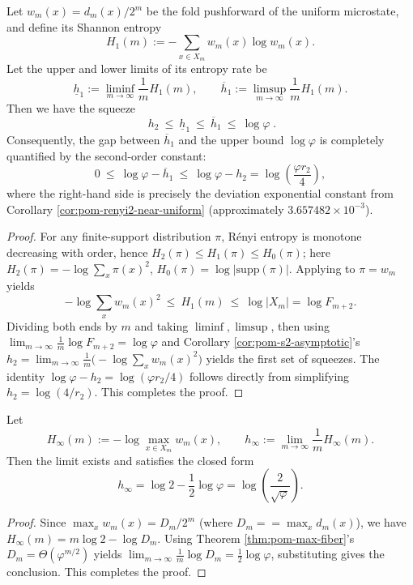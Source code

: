 \begin{corollary}[Entropy Spectrum Squeeze: \texorpdfstring{$h_2\le h_1\le \log\varphi$}{h2<=h1<=log phi}]\label{cor:pom-shannon-entropy-squeeze}
Let \(w_m(x)=d_m(x)/2^m\) be the fold pushforward of the uniform microstate, and define its Shannon entropy
\[
H_1(m):=-\sum_{x\in X_m}w_m(x)\log w_m(x).
\]
Let the upper and lower limits of its entropy rate be
\[
\underline h_1:=\liminf_{m\to\infty}\frac{1}{m}H_1(m),
\qquad
\overline h_1:=\limsup_{m\to\infty}\frac{1}{m}H_1(m).
\]
Then we have the squeeze
\[
\boxed{\;
h_2\ \le\ \underline h_1\ \le\ \overline h_1\ \le\ \log\varphi\; }.
\]
Consequently, the gap between \(\overline h_1\) and the upper bound \(\log\varphi\) is completely quantified by the second-order constant:
\[
0\ \le\ \log\varphi-\overline h_1\ \le\ \log\varphi-h_2
=\log\!\left(\frac{\varphi r_2}{4}\right),
\]
where the right-hand side is precisely the deviation exponential constant from Corollary \ref{cor:pom-renyi2-near-uniform} (approximately \(3.657482\times 10^{-3}\)).
\end{corollary}
\begin{proof}
For any finite-support distribution \(\pi\), Rényi entropy is monotone decreasing with order, hence \(H_2(\pi)\le H_1(\pi)\le H_0(\pi)\);
here \(H_2(\pi)=-\log\sum_x\pi(x)^2\), \(H_0(\pi)=\log|\mathrm{supp}(\pi)|\).
Applying to \(\pi=w_m\) yields
\[
-\log\sum_x w_m(x)^2\ \le\ H_1(m)\ \le\ \log|X_m|=\log F_{m+2}.
\]
Dividing both ends by \(m\) and taking \(\liminf,\limsup\), then using \(\lim_{m\to\infty}\frac{1}{m}\log F_{m+2}=\log\varphi\) and Corollary \ref{cor:pom-s2-asymptotic}'s
\(
h_2=\lim_{m\to\infty}\frac{1}{m}\bigl(-\log\sum_x w_m(x)^2\bigr)
\)
yields the first set of squeezes. The identity \(\log\varphi-h_2=\log(\varphi r_2/4)\) follows directly from simplifying \(h_2=\log(4/r_2)\). This completes the proof.
\end{proof}

\begin{corollary}\label{cor:pom-min-entropy-rate}
Let
\[
H_\infty(m):=-\log\max_{x\in X_m}w_m(x),
\qquad
h_\infty:=\lim_{m\to\infty}\frac{1}{m}H_\infty(m).
\]
Then the limit exists and satisfies the closed form
\[
\boxed{\;
h_\infty=\log 2-\frac{1}{2}\log\varphi=\log\!\left(\frac{2}{\sqrt{\varphi}}\right).\;}
\]
\end{corollary}
\begin{proof}
Since \(\max_x w_m(x)=D_m/2^m\) (where \(D_m==\max_x d_m(x)\)), we have
\(
H_\infty(m)=m\log 2-\log D_m
\).
Using Theorem \ref{thm:pom-max-fiber}'s \(D_m=\Theta(\varphi^{m/2})\) yields
\(
\lim_{m\to\infty}\frac{1}{m}\log D_m=\frac{1}{2}\log\varphi
\),
substituting gives the conclusion. This completes the proof.
\end{proof}


